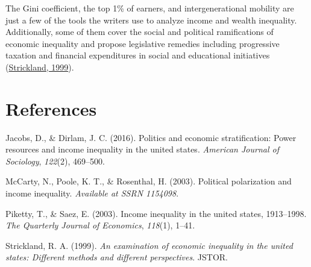 \documentclass[
  12pt,
]{article}
\newlength{\cslhangindent}
\newlength{\cslentryspacingunit} %
\newenvironment{CSLReferences}[2] %
 {%
  \setlength{\parindent}{0pt}
  \ifodd #1
  \let\oldpar\par
  \def\par{\hangindent=\cslhangindent\oldpar}
  \fi
  \setlength{\parskip}{#2\cslentryspacingunit}
 }%
 {}
\begin{document}
The Gini coefficient, the top 1\% of earners, and intergenerational mobility are just a few of the tools the writers use to analyze income and wealth inequality. Additionally, some of them cover the social and political ramifications of economic inequality and propose legislative remedies including progressive taxation and financial expenditures in social and educational initiatives (\protect\hyperlink{ref-strickland1999examination}{Strickland, 1999}).

\newpage

\hypertarget{references}{%
\section{References}\label{references}}

\hypertarget{refs}{}
\begin{CSLReferences}{1}{0}
\leavevmode{}%
Jacobs, D., \& Dirlam, J. C. (2016). Politics and economic stratification: Power resources and income inequality in the united states. \emph{American Journal of Sociology}, \emph{122}(2), 469--500.

\leavevmode{}%
McCarty, N., Poole, K. T., \& Rosenthal, H. (2003). Political polarization and income inequality. \emph{Available at SSRN 1154098}.

\leavevmode{}%
Piketty, T., \& Saez, E. (2003). Income inequality in the united states, 1913--1998. \emph{The Quarterly Journal of Economics}, \emph{118}(1), 1--41.

\leavevmode{}%
Strickland, R. A. (1999). \emph{An examination of economic inequality in the united states: Different methods and different perspectives}. JSTOR.

\end{CSLReferences}
\end{document}
